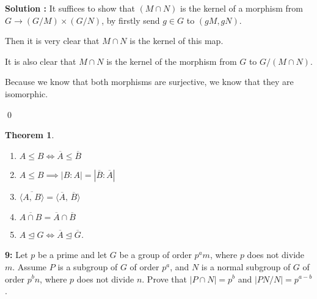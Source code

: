 \documentclass[11pt]{article}
\newcommand{\iprod}[2]{\langle #1,\, #2\rangle}
\newenvironment{exercise}[1]
	{\noindent \textbf{#1:}}
	{\par \vspace{0.5\baselineskip}}
\newenvironment{solution}[1][\unskip]
	{\noindent \textbf{Solution #1:} }
	{\qed \pagebreak}
\newtheorem{theorem}{Theorem}
\begin{document}
\begin{solution}
	It suffices to show that $(M \cap N)$ is the kernel of
	a morphism from $G \to (G / M) \times (G / N)$, by firstly send
	$g \in G$ to $(gM, gN)$.

	Then it is very clear that $M \cap N$ is the kernel of this map.

	It is also clear that $M\cap N$ is the kernel of the morphism from $G$ to $G/(M \cap N)$.

	Because we know that both morphisms are surjective, we know that they are isomorphic.

\end{solution}

\begin{theorem}
	\begin{enumerate}
		\item $A \le B \iff \overline{A} \le \overline{B}$
		\item $A \le B \implies |B:A| = |\overline{B} : \overline{A}|$
		\item $\overline{\iprod{A}{B}} = \iprod{\overline{A}}{\overline{B}}$
		\item $\overline{A \cap B} = \overline{A}\cap \overline{B}$
		\item $A \trianglelefteq G \iff \overline{A} \trianglelefteq \overline{G}$.
	\end{enumerate}
\end{theorem}

\begin{exercise}{9}
	Let $p$ be a prime and let $G$ be a group of order $p^am$,
	where $p$ does not divide $m$.
	Assume $P$ is a subgroup of $G$ of order $p^a$,
	and $N$ is a normal subgroup of $G$ of order $p^bn$,
	where $p$ does not divide $n$.
	Prove that $|P \cap N| = p^b$ and $|PN / N| = p^{a-b}$.
\end{exercise}
\end{document}
